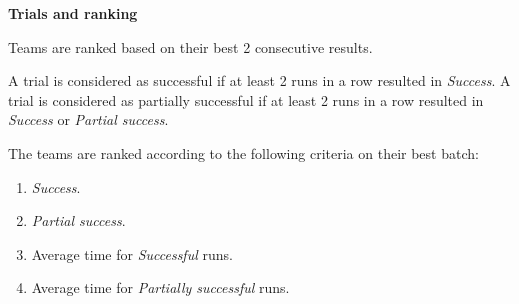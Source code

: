 {\bfseries Trials and ranking}

\smallskip

Teams are ranked based on their best 2 consecutive results.

A trial is considered as successful if at least 2 runs in a row resulted in \textit{Success}. A trial is considered as
partially successful if at least 2 runs in a row resulted in \textit{Success} or \textit{Partial success}.

The teams are ranked according to the following criteria on their best batch:
\begin{enumerate}
\item \textit{Success}.
\item \textit{Partial success}.
\item Average time for \textit{Successful} runs.
\item Average time for \textit{Partially successful} runs.
\end{enumerate}
